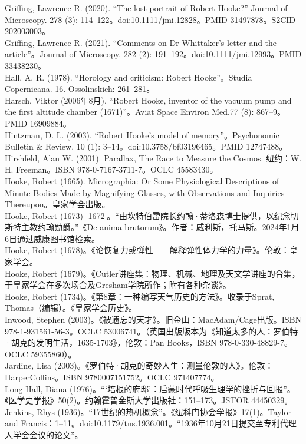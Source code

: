 Griffing, Lawrence R. (2020). “The lost portrait of Robert Hooke?” Journal of Microscopy. 278 (3): 114–122。doi:10.1111/jmi.12828。PMID 31497878。S2CID 202003003。\\
Griffing, Lawrence R. (2021). “Comments on Dr Whittaker's letter and the article”。Journal of Microscopy. 282 (2): 191–192。doi:10.1111/jmi.12993。PMID 33438230。\\
Hall, A. R. (1978). “Horology and criticism: Robert Hooke”。Studia Copernicana. 16. Ossolinskich: 261–281。\\
Harsch, Viktor (2006年8月). “Robert Hooke, inventor of the vacuum pump and the first altitude chamber (1671)”。Aviat Space Environ Med.77 (8): 867–9。PMID 16909884。\\
Hintzman, D. L. (2003). “Robert Hooke's model of memory”。Psychonomic Bulletin & Review. 10 (1): 3–14。doi:10.3758/bf03196465。PMID 12747488。  
Hirshfeld, Alan W. (2001). Parallax, The Race to Measure the Cosmos. 纽约：W. H. Freeman。ISBN 978-0-7167-3711-7。OCLC 45583430。\\
Hooke, Robert (1665). Micrographia: Or Some Physiological Descriptions of Minute Bodies Made by Magnifying Glasses, with Observations and Inquiries Thereupon。皇家学会出版。\\
Hooke, Robert (1673) [1672]。“由坎特伯雷院长约翰·蒂洛森博士提供，以纪念切斯特主教约翰勋爵。”《De anima brutorum》。作者：威利斯，托马斯。2024年1月6日通过威康图书馆检索。\\
Hooke, Robert (1678)。《论恢复力或弹性——解释弹性体力学的力量》。伦敦：皇家学会。\\
Hooke, Robert (1679)。《Cutler讲座集：物理、机械、地理及天文学讲座的合集，于皇家学会在多次场合及Gresham学院所作；附有各种杂谈》。\\
Hooke, Robert (1734)。《第8章：一种编写天气历史的方法》。收录于Sprat, Thomas（编辑）。《皇家学会历史》。\\
Inwood, Stephen (2003)。《被遗忘的天才》。旧金山：MacAdam/Cage出版。ISBN 978-1-931561-56-3。OCLC 53006741。（英国出版版本为《知道太多的人：罗伯特·胡克的发明生活，1635-1703》，伦敦：Pan Books，ISBN 978-0-330-48829-7。OCLC 59355860）。\\
Jardine, Lisa (2003)。《罗伯特·胡克的奇妙人生：测量伦敦的人》。伦敦：HarperCollins。ISBN 9780007151752。OCLC 971407774。\\
Long Hall, Diana (1976)。“‘培根的府邸’：启蒙时代呼吸生理学的挫折与回报”。《医学史学报》50(2)。约翰霍普金斯大学出版社：151–173。JSTOR 44450329。\\
Jenkins, Rhys (1936)。“17世纪的热机概念”。《纽科门协会学报》17(1)。Taylor and Francis：1–11。doi:10.1179/tns.1936.001。“1936年10月21日提交至专利代理人学会会议的论文”。\\
